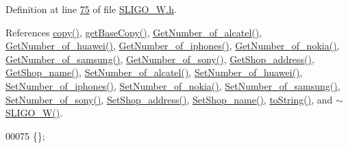 Definition at line \hyperlink{_s_l_i_g_o___w_8h_source_l00075}{75} of file \hyperlink{_s_l_i_g_o___w_8h_source}{S\+L\+I\+G\+O\+\_\+\+W.\+h}.



References \hyperlink{_s_l_i_g_o___w_8cpp_source_l00035}{copy()}, \hyperlink{_s_l_i_g_o___w_8cpp_source_l00022}{get\+Base\+Copy()}, \hyperlink{_s_l_i_g_o___w_8cpp_source_l00073}{Get\+Number\+\_\+of\+\_\+alcatel()}, \hyperlink{_s_l_i_g_o___w_8cpp_source_l00089}{Get\+Number\+\_\+of\+\_\+huawei()}, \hyperlink{_s_l_i_g_o___w_8cpp_source_l00113}{Get\+Number\+\_\+of\+\_\+iphones()}, \hyperlink{_s_l_i_g_o___w_8cpp_source_l00081}{Get\+Number\+\_\+of\+\_\+nokia()}, \hyperlink{_s_l_i_g_o___w_8cpp_source_l00105}{Get\+Number\+\_\+of\+\_\+samsung()}, \hyperlink{_s_l_i_g_o___w_8cpp_source_l00097}{Get\+Number\+\_\+of\+\_\+sony()}, \hyperlink{_s_l_i_g_o___w_8cpp_source_l00129}{Get\+Shop\+\_\+address()}, \hyperlink{_s_l_i_g_o___w_8cpp_source_l00121}{Get\+Shop\+\_\+name()}, \hyperlink{_s_l_i_g_o___w_8cpp_source_l00069}{Set\+Number\+\_\+of\+\_\+alcatel()}, \hyperlink{_s_l_i_g_o___w_8cpp_source_l00085}{Set\+Number\+\_\+of\+\_\+huawei()}, \hyperlink{_s_l_i_g_o___w_8cpp_source_l00109}{Set\+Number\+\_\+of\+\_\+iphones()}, \hyperlink{_s_l_i_g_o___w_8cpp_source_l00077}{Set\+Number\+\_\+of\+\_\+nokia()}, \hyperlink{_s_l_i_g_o___w_8cpp_source_l00101}{Set\+Number\+\_\+of\+\_\+samsung()}, \hyperlink{_s_l_i_g_o___w_8cpp_source_l00093}{Set\+Number\+\_\+of\+\_\+sony()}, \hyperlink{_s_l_i_g_o___w_8cpp_source_l00125}{Set\+Shop\+\_\+address()}, \hyperlink{_s_l_i_g_o___w_8cpp_source_l00117}{Set\+Shop\+\_\+name()}, \hyperlink{_s_l_i_g_o___w_8cpp_source_l00062}{to\+String()}, and \hyperlink{_s_l_i_g_o___w_8cpp_source_l00012}{$\sim$\+S\+L\+I\+G\+O\+\_\+\+W()}.


\begin{DoxyCode}
00075 \{\};
\end{DoxyCode}


